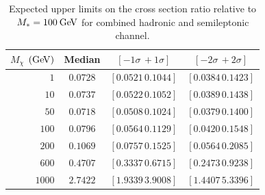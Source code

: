 \begin{table}[!ht]
\centering
\begin{tabular}{|r|c|c|c|}
\hline
  $M_\chi$ $(\mathrm{Ge\kern -0.1em V})$ & Median & $\left[-1\sigma\, +1\sigma\right]$ & $\left[-2\sigma\, +2\sigma\right]$ \\
\hline
  $1$               & $0.0728$ & $\left[0.0521\, 0.1044\right]$ & $\left[0.0384\, 0.1423\right]$ \\
  $10$              & $0.0737$ & $\left[0.0522\, 0.1052\right]$ & $\left[0.0389\, 0.1438\right]$ \\
  $50$              & $0.0718$ & $\left[0.0508\, 0.1024\right]$ & $\left[0.0379\, 0.1400\right]$ \\
  $100$             & $0.0796$ & $\left[0.0564\, 0.1129\right]$ & $\left[0.0420\, 0.1548\right]$ \\
  $200$             & $0.1069$ & $\left[0.0757\, 0.1525\right]$ & $\left[0.0564\, 0.2085\right]$ \\
  $600$             & $0.4707$ & $\left[0.3337\, 0.6715\right]$ & $\left[0.2473\, 0.9238\right]$ \\
  $1000$            & $2.7422$ & $\left[1.9339\, 3.9008\right]$ & $\left[1.4407\, 5.3396\right]$ \\
\hline
\end{tabular}
\caption{Expected upper limits on the cross section ratio relative to $M_*=100\:\mathrm{Ge\kern -0.1em V}$ for combined hadronic and semileptonic channel.}
\label{tab:rLimits_count}
\end{table}

